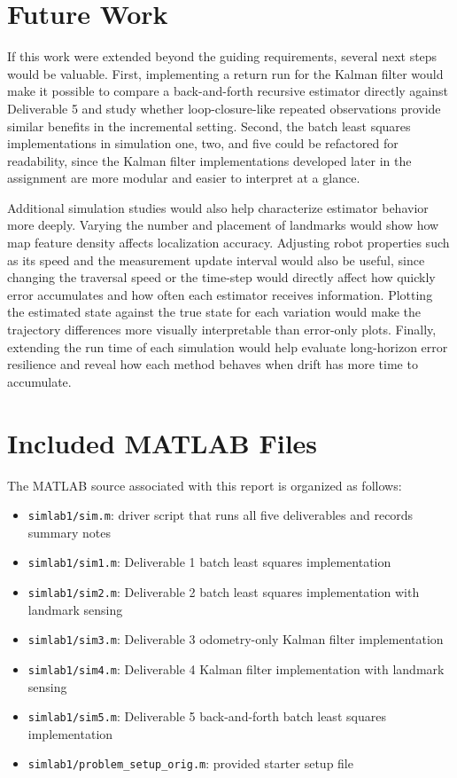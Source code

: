 \documentclass[11pt]{article}
\begin{document}
\section{Future Work}
If this work were extended beyond the guiding requirements, several next steps
would be valuable. First, implementing a return run for the Kalman filter would make it
possible to compare a back-and-forth recursive estimator directly against Deliverable 5
and study whether loop-closure-like repeated observations provide similar benefits in
the incremental setting. Second, the batch least squares implementations in simulation
one, two, and five could be refactored for readability, since the Kalman filter implementations
developed later in the assignment are more modular and easier to interpret at a glance.

Additional simulation studies would also help characterize estimator behavior more
deeply. Varying the number and placement of landmarks would show how map feature density
affects localization accuracy. Adjusting robot properties such as its speed and the
measurement update interval would also be useful, since changing the traversal speed or
the time-step would directly affect how quickly error accumulates and how often each
estimator receives information. Plotting the estimated state against the true state for
each variation would make the trajectory differences more visually interpretable than
error-only plots. Finally, extending the run time of each simulation would help evaluate
long-horizon error resilience and reveal how each method behaves when drift has more
time to accumulate.

\section{Included MATLAB Files}
The MATLAB source associated with this report is organized as follows:
\begin{itemize}[leftmargin=1.5em]
    \item \texttt{simlab1/sim.m}: driver script that runs all five deliverables and
    records summary notes
    \item \texttt{simlab1/sim1.m}: Deliverable 1 batch least squares implementation
    \item \texttt{simlab1/sim2.m}: Deliverable 2 batch least squares implementation
    with landmark sensing
    \item \texttt{simlab1/sim3.m}: Deliverable 3 odometry-only Kalman filter
    implementation
    \item \texttt{simlab1/sim4.m}: Deliverable 4 Kalman filter implementation with
    landmark sensing
    \item \texttt{simlab1/sim5.m}: Deliverable 5 back-and-forth batch least squares
    implementation
    \item \texttt{simlab1/problem\_setup\_orig.m}: provided starter setup file
\end{itemize}
\end{document}
